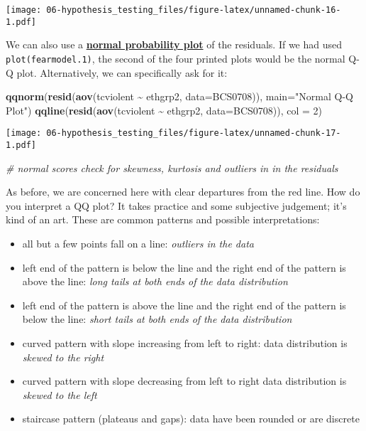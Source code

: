\documentclass[
]{book}
\newenvironment{Shaded}{\begin{snugshade}}{\end{snugshade}}
\newcommand{\AttributeTok}[1]{\textcolor[rgb]{0.13,0.29,0.53}{#1}}
\newcommand{\CommentTok}[1]{\textcolor[rgb]{0.56,0.35,0.01}{\textit{#1}}}
\newcommand{\DecValTok}[1]{\textcolor[rgb]{0.00,0.00,0.81}{#1}}
\newcommand{\FunctionTok}[1]{\textcolor[rgb]{0.13,0.29,0.53}{\textbf{#1}}}
\newcommand{\NormalTok}[1]{#1}
\newcommand{\SpecialCharTok}[1]{\textcolor[rgb]{0.81,0.36,0.00}{\textbf{#1}}}
\newcommand{\StringTok}[1]{\textcolor[rgb]{0.31,0.60,0.02}{#1}}
\begin{document}
\texttt{[image: 06-hypothesis\_testing\_files/figure-latex/unnamed-chunk-16-1.pdf]}

We can also use a \href{http://en.wikipedia.org/wiki/Normal_probability_plot}{\textbf{normal probability plot}} of the residuals. If we had used \texttt{plot(fearmodel.1)}, the second of the four printed plots would be the normal Q-Q plot. Alternatively, we can specifically ask for it:

\begin{Shaded}
\begin{Highlighting}[]
\FunctionTok{qqnorm}\NormalTok{(}\FunctionTok{resid}\NormalTok{(}\FunctionTok{aov}\NormalTok{(tcviolent }\SpecialCharTok{\textasciitilde{}}\NormalTok{ ethgrp2, }\AttributeTok{data=}\NormalTok{BCS0708)), }\AttributeTok{main=}\StringTok{"Normal Q{-}Q Plot"}\NormalTok{)}
\FunctionTok{qqline}\NormalTok{(}\FunctionTok{resid}\NormalTok{(}\FunctionTok{aov}\NormalTok{(tcviolent }\SpecialCharTok{\textasciitilde{}}\NormalTok{ ethgrp2, }\AttributeTok{data=}\NormalTok{BCS0708)), }\AttributeTok{col =} \DecValTok{2}\NormalTok{)}
\end{Highlighting}
\end{Shaded}

\texttt{[image: 06-hypothesis\_testing\_files/figure-latex/unnamed-chunk-17-1.pdf]}

\begin{Shaded}
\begin{Highlighting}[]
\CommentTok{\# normal scores check for skewness, kurtosis and outliers in in the residuals }
\end{Highlighting}
\end{Shaded}

As before, we are concerned here with clear departures from the red line. How do you interpret a QQ plot? It takes practice and some subjective judgement; it's kind of an art. These are common patterns and possible interpretations:

\begin{itemize}
\item
  all but a few points fall on a line: \emph{outliers in the data}
\item
  left end of the pattern is below the line and the right end of the pattern is above the line: \emph{long tails at both ends of the data distribution}
\item
  left end of the pattern is above the line and the right end of the pattern is below the line: \emph{short tails at both ends of the data distribution}
\item
  curved pattern with slope increasing from left to right: data distribution is \emph{skewed to the right}
\item
  curved pattern with slope decreasing from left to right data distribution is \emph{skewed to the left}
\item
  staircase pattern (plateaus and gaps): data have been rounded or are discrete
\end{itemize}
\end{document}
